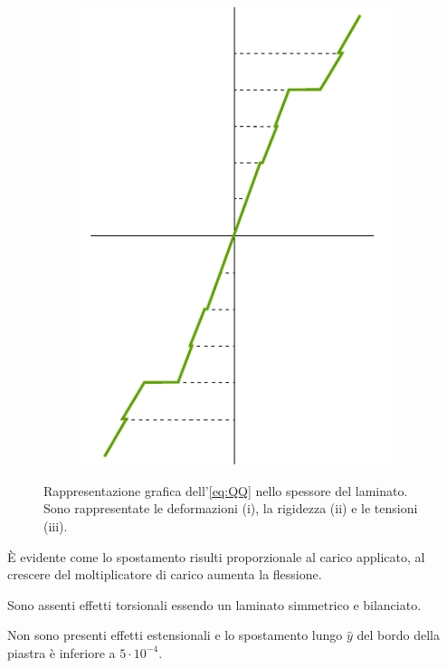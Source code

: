 \documentclass[a4paper,num-refs]{oup-contemporary}
\begin{document}
\begin{figure}[bt!]
\begin{subfigure}{0.25\linewidth}
		\includegraphics[width=\textwidth]{stress.pdf}
		\caption{}
	\end{subfigure}
	\caption{Rappresentazione grafica dell'\cref{eq:QQ} nello spessore del laminato. Sono rappresentate le deformazioni (i), la rigidezza (ii) e le tensioni (iii). }
	\label{fig:layout}
\end{figure}

È evidente come lo spostamento risulti proporzionale al carico applicato, al crescere del moltiplicatore di carico aumenta la flessione. 

Sono assenti effetti torsionali essendo un laminato simmetrico e bilanciato.

Non sono presenti effetti estensionali e lo spostamento lungo $\hat y$ del bordo della piastra è inferiore a $5 \cdot 10^{-4}$. 
\end{document}
